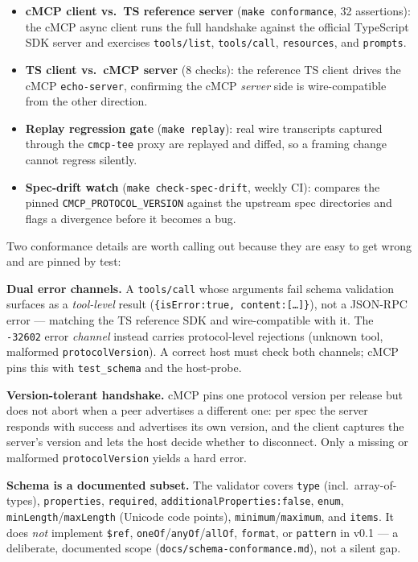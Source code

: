 \documentclass[10pt]{article}
\newcommand{\code}[1]{\texttt{\small #1}}
\begin{document}
\begin{itemize}
  \item \textbf{cMCP client vs.\ TS reference server} (\code{make conformance},
    32 assertions): the cMCP async client runs the full handshake against the
    official TypeScript SDK server and exercises \code{tools/list},
    \code{tools/call}, \code{resources}, and \code{prompts}.
  \item \textbf{TS client vs.\ cMCP server} (8 checks): the reference TS client
    drives the cMCP \code{echo-server}, confirming the cMCP \emph{server} side
    is wire-compatible from the other direction.
  \item \textbf{Replay regression gate} (\code{make replay}): real wire
    transcripts captured through the \code{cmcp-tee} proxy are replayed and
    diffed, so a framing change cannot regress silently.
  \item \textbf{Spec-drift watch} (\code{make check-spec-drift}, weekly CI):
    compares the pinned \code{CMCP\_PROTOCOL\_VERSION} against the upstream
    spec directories and flags a divergence before it becomes a bug.
\end{itemize}

Two conformance details are worth calling out because they are easy to get
wrong and are pinned by test:

\textbf{Dual error channels.} A \code{tools/call} whose arguments fail schema
validation surfaces as a \emph{tool-level} result
(\code{\{isError:true, content:[\dots]\}}), not a JSON-RPC error --- matching
the TS reference SDK and wire-compatible with it. The \code{-32602} error
\emph{channel} instead carries protocol-level rejections (unknown tool,
malformed \code{protocolVersion}). A correct host must check both channels;
cMCP pins this with \code{test\_schema} and the host-probe.

\textbf{Version-tolerant handshake.} cMCP pins one protocol version per release
but does not abort when a peer advertises a different one: per spec the server
responds with success and advertises its own version, and the client captures
the server's version and lets the host decide whether to disconnect. Only a
missing or malformed \code{protocolVersion} yields a hard error.

\textbf{Schema is a documented subset.} The validator covers \code{type}
(incl.\ array-of-types), \code{properties}, \code{required},
\code{additionalProperties:false}, \code{enum}, \code{minLength}/\code{maxLength}
(Unicode code points), \code{minimum}/\code{maximum}, and \code{items}. It does
\emph{not} implement \code{\$ref}, \code{oneOf}/\code{anyOf}/\code{allOf},
\code{format}, or \code{pattern} in v0.1 --- a deliberate, documented scope
(\code{docs/schema-conformance.md}), not a silent gap.
\end{document}
